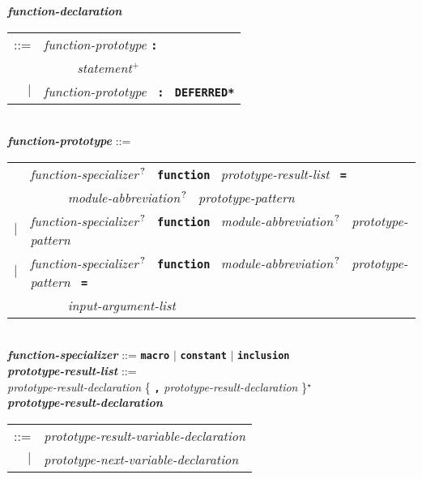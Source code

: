 \documentclass[12pt]{article}
\newcommand{\TT}[1]{{\tt \bfseries #1}}
\newcommand{\STAR}{{\Large $^\star$}}
\newcommand{\PLUS}[1][]{{$^{+#1}$}}
\newcommand{\QMARK}{{$^{\,\mbox{\footnotesize ?}}$}}
\newcommand{\ttkey}[1]{{\tt \bfseries #1}}
\newcommand{\emkey}[1]{{\em \bfseries #1}}
\newenvironment{indpar}[1][0.3in]%
	{\begin{list}{}%
		     {\setlength{\itemsep}{0in}%
		      \setlength{\topsep}{0in}%
		      \setlength{\parsep}{1ex}%
		      \setlength{\labelwidth}{#1}%
		      \setlength{\leftmargin}{#1}%
		      \addtolength{\leftmargin}{\labelsep}}%
	 \item}%
	{\end{list}}
\begin{document}
\begin{indpar}[0.1in]
\emkey{function-declaration}\label{FUNCTION-DECLARATION}
    \begin{tabular}[t]{rl}
    ::= &  {\em function-prototype} \TT{:} \\
	& \TT{~~~~~}{\em statement}\PLUS{} \\
    $|$ &  {\em function-prototype}~ \TT{:}~ \ttkey{*DEFERRED*} \\
    \end{tabular}
\\[2ex]
\emkey{function-prototype}\label{FUNCTION-PROTOTYPE} ::= \\
\hspace*{0.25in}
    \begin{tabular}[t]{@{}rl}
        & {\em function-specializer}\QMARK{}~ \ttkey{function}~
          {\em prototype-result-list}~ \TT{=} \\
	& \TT{~~~~~} {\em module-abbreviation}\QMARK{}~
	             {\em prototype-pattern} \\
    $|$ & {\em function-specializer}\QMARK{}~ \ttkey{function}~
          {\em module-abbreviation}\QMARK{}~ {\em prototype-pattern} \\
    $|$ & {\em function-specializer}\QMARK{}~ \ttkey{function}~
          {\em module-abbreviation}\QMARK{}~ {\em prototype-pattern}~ \TT{=} \\
	& \TT{~~~~~} {\em input-argument-list} \\
    \end{tabular}
\\[2ex]
\emkey{function-specializer}\label{FUNCTION-SPECIALIZER} ::=
	\TT{macro} $|$ \TT{constant} $|$ \TT{inclusion}
\\[2ex]
\emkey{prototype-result-list}\label{PROTOTYPE-RESULT-LIST} ::= \\
\hspace*{0.5in}
    {\em prototype-result-declaration}
    \{ \TT{,} {\em prototype-result-declaration} \}\STAR{}
\\[0.5ex]
\emkey{prototype-result-declaration}\label{PROTOTYPE-RESULT-DECLARATION} \\
\hspace*{0.5in}\begin{tabular}[t]{rl}
    ::= & {\em prototype-result-variable-declaration} \\
    $|$ & {\em prototype-next-variable-declaration} \\
    \end{tabular}
\\[0.5ex]

\end{indpar}
\end{document}
